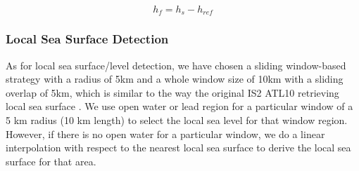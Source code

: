     \begin{equation}
        h_f = h_s - h_{ref}
    \end{equation}



\subsubsection{Local Sea Surface Detection}
As for local sea surface/level detection, we have chosen a sliding window-based strategy with a radius of 5km and a whole window size of 10km with a sliding overlap of 5km, which is similar to the way the original IS2 ATL10 retrieving local sea surface \cite{kwok2022icesat}.
We use open water or lead region for a particular window of a 5 km radius (10 km length) to select the local sea level for that window region. 
However, if there is no open water for a particular window, we do a linear interpolation with respect to the nearest local sea surface to derive the local sea surface for that area.


